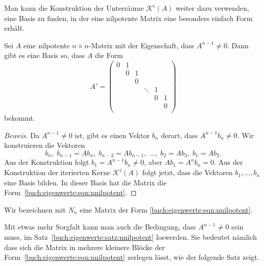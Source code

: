Man kann die Konstruktion der Unterräume $\mathcal{K}^i(A)$ weiter
dazu verwenden, eine Basis zu finden, in der eine nilpotente Matrix
eine besonders einfach Form erhält.

\begin{satz}
\label{buch:eigenwerte:satz:nnilpotent}
Sei $A$ eine nilpotente $n\times n$-Matrix mit der Eigenschaft, dass
$A^{n-1}\ne 0$.
Dann gibt es eine Basis so, dass $A$ die Form
\begin{equation}
A'
=
\begin{pmatrix}
0&1& &      & & \\
 &0&1&      & & \\
 & &0&      & & \\
 & & &\ddots&1& \\
 & & &      &0&1\\
 & & &      & &0\\
\end{pmatrix}
\label{buch:eigenwerte:eqn:nnilpotent}
\end{equation}
bekommt.
\end{satz}

\begin{proof}[Beweis]
Da $A^{n-1}\ne 0$ ist, gibt es einen Vektor $b_n$ derart, dass $A^{n-1}b_n\ne0$.
Wir konstruieren die Vektoren
\[
b_n,\;
b_{n-1}=Ab_n,\;
b_{n-2}=Ab_{n-1},\;
\dots,\;
b_2=Ab_3,\;
b_1=Ab_2.
\]
Aus der Konstruktion folgt $b_1=A^{n-1}b_n\ne 0$, aber $Ab_1=A^nb_n=0$.
Aus der Konstruktion der iterierten Kerne $\mathcal{K}^i(A)$ folgt jetzt,
dass die Vektoren $b_1,\dots,b_n$ eine Basis bilden.
In dieser Basis hat die Matrix die Form~\ref{buch:eigenwerte:eqn:nnilpotent}.
\end{proof}

\begin{definition}
\label{buch:eigenwerte:def:Nn}
Wir bezeichnen mit $N_n$ eine Matrix der Form
\eqref{buch:eigenwerte:eqn:nnilpotent}.
\end{definition}

Mit etwas mehr Sorgfalt kann man auch die Bedingung, dass $A^{n-1}\ne 0$
sein muss, im Satz~\ref{buch:eigenwerte:satz:nnilpotent} loswerden.
Sie bedeutet nämlich dass sich die Matrix in mehrere kleinere Blöcke
der Form~\eqref{buch:eigenwerte:eqn:nnilpotent} zerlegen lässt, wie
der folgende Satz zeigt.

